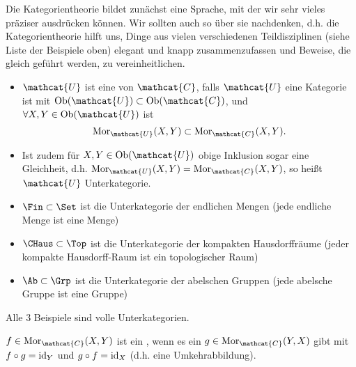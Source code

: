 \begin{dremark}
    Die Kategorientheorie bildet zunächst eine Sprache, mit der wir sehr vieles präziser ausdrücken können. Wir sollten auch so über sie nachdenken, d.h. die Kategorientheorie hilft uns, Dinge aus vielen verschiedenen Teildisziplinen (siehe Liste der Beispiele oben) elegant und knapp zusammenzufassen und Beweise, die gleich geführt werden, zu vereinheitlichen.
\end{dremark}

\begin{definition}[Unterkategorie]\label{def:unterkategorie}
    \begin{itemize}
        \item $\mathcat{U}$ ist eine  von $\mathcat{C}$, falls $\mathcat{U}$ eine Kategorie ist mit $\Ob(\mathcat{U}) \subset \Ob(\mathcat{C})$, und $\forall X,Y\in \Ob(\mathcat{U})$ ist
    \[
        \Mor_{\mathcat{U}}(X,Y) \subset \Mor_{\mathcat{C}}(X,Y)
    .\] 
\item Ist zudem für $X,Y \in \Ob(\mathcat{U})$ obige Inklusion sogar eine Gleichheit, d.h. $\Mor_{\mathcat{U}}(X,Y) = \Mor_{\mathcat{C}}(X,Y)$, so heißt $\mathcat{U}$  Unterkategorie. 
    \end{itemize}
\end{definition}

\begin{example}
    \begin{itemize}
        \item $\Fin \subset \Set$ ist die Unterkategorie der endlichen Mengen (jede endliche Menge ist eine Menge)
        \item $\CHaus \subset \Top$ ist die Unterkategorie der kompakten Hausdorffräume (jeder kompakte Hausdorff-Raum ist ein topologischer Raum)
        \item $\Ab\subset \Grp$ ist die Unterkategorie der abelschen Gruppen (jede abelsche Gruppe ist eine Gruppe)
    \end{itemize}
    Alle 3 Beispiele sind volle Unterkategorien.
\end{example}

\begin{definition}[Isomorphismus]\label{def:isomorphismus}
    $f\in \Mor_{\mathcat{C}}(X,Y)$ ist ein , wenn es ein $g\in \Mor_{\mathcat{C}}(Y,X)$ gibt mit $f \circ  g = \operatorname{id}_Y$ und $g \circ f = \operatorname{id}_X$ (d.h. eine Umkehrabbildung).
\end{definition}

